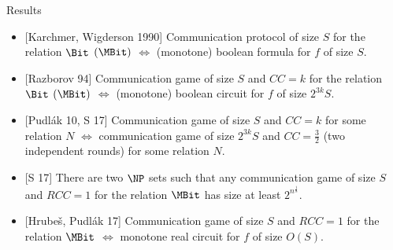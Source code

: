 \begin{frame}{Results}
    \begin{itemize}
        \item {[Karchmer, Wigderson 1990]} Communication protocol of size $S$ for the relation $\Bit$
            \alert{$(\MBit)$} $\Leftrightarrow$ \alert{(monotone)} boolean formula for $f$ of size $S$.
        \item {[Razborov 94]} Communication game of size $S$ and $CC = k$ for the relation $\Bit$
            \alert{$(\MBit)$} $\Leftrightarrow$ \alert{(monotone)} boolean circuit for $f$ of size
            $2^{3k} S$.
        \pause
        \item {[Pudl{\'{a}}k 10, S 17]} Communication game of size $S$ and $CC = k$ for some relation $N$
            $\Leftrightarrow$ communication game of size $2^{3k} S$ and $CC = \frac{3}{2}$ (two
            independent rounds) for some relation $N$.
    \end{itemize}
    
    \vspace{0.3cm}
    \pause
    \begin{itemize}                
        \item {[S 17]} There are two $\NP$ sets such that any communication game of size $S$ and $RCC = 1$
            for the relation $\MBit$ has size at least $2^{n^{\frac{1}{8}}}$.
        \pause    
        \item {[Hrube{\v{s}}, Pudl{\'{a}}k 17]} Communication game of size $S$ and $RCC = 1$ for the
            relation $\MBit$ $\Leftrightarrow$ monotone {\color{blue} real}
            circuit for $f$ of size $O(S)$.
    \end{itemize}
\end{frame}





